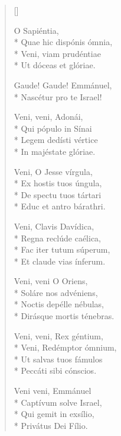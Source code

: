 \newHymn
{}

\begin{multicols}{2}
\begin{verse}[\versewidth]

 O Sapiéntia,\\*
Quae hic dispónis ómnia,   \\*        
Veni, viam prudéntiae        \\*      
Ut dóceas et glóriae. 
\pointtrans

 Gaude! Gaude! Emmánuel,\\*
Nascétur pro te Israel! 

Veni, veni, Adonái,\\*
Qui pópulo in Sínai               \\* 
Legem dedísti vértice              \\*
In majéstate glóriae.

Veni, O Jesse vírgula,\\*
Ex hostis tuos úngula,             \\*
De spectu tuos tártari             \\*
Educ et antro bárathri.

Veni, Clavis Davídica,\\*
Regna reclúde caélica,             \\*
Fac iter tutum súperum,            \\*
Et claude vias ínferum.

Veni, veni O Oriens,\\*
Soláre nos advéniens,              \\*
Noctis depélle nébulas,            \\*
Dirásque mortis ténebras.

Veni, veni, Rex géntium,\\*
Veni, Redémptor ómnium,            \\*
Ut salvas tuos fámulos             \\*
Peccáti sibi cónscios.

Veni veni, Emmánuel\\*
Captívum solve Israel,      \\*       
Qui gemit in exsílio,         \\*     
Privátus Dei Fílio.   

\end{verse}
\end{multicols}

